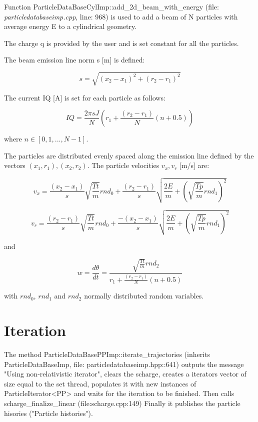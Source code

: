 \documentclass[12pt,a4paper]{article}
\begin{document}
Function ParticleDataBaseCylImp::add\_2d\_beam\_with\_energy (file: \textit{particledatabaseimp.cpp}, line: 968) is used to add a beam of N particles with average energy E to a cylindrical geometry.

The charge q is provided by the user and is set constant for all the particles.

The beam emission line norm s [m] is defined:

\begin{equation}
	s = \sqrt{(x_{2}-x_{1})^2+(r_{2}-r_{1})^2}
\end{equation}

The current IQ [A] is set for each particle as follows:

\begin{equation}
	IQ =\frac{2\pi sJ}{N}(r_{1} + \frac{(r_{2}-r_{1})}{N}(n+0.5))
\end{equation}

where $n\in[0,1,...,N-1]$. 

The particles are distributed evenly spaced along the emission line defined by the vectors $(x_{1},r_{1}), (x_{2},r_{2})$. The particle velocities $v_{x},v_{r}$ [m/s] are:

\begin{equation}
	v_{x}=\frac{(x_{2}-x_{1})}{s}\sqrt{\frac{Tt}{m}}rnd_{0}+\frac{(r_{2}-r_{1})}{s}\sqrt{\frac{2E}{m}+(\sqrt{\frac{Tp}{m}}rnd_{1})^2}
\end{equation}

\begin{equation}
	v_{r}=\frac{(r_{2}-r_{1})}{s}\sqrt{\frac{Tt}{m}}rnd_{0}+\frac{-(x_{2}-x_{1})}{s}\sqrt{\frac{2E}{m}+(\sqrt{\frac{Tp}{m}}rnd_{1})^2} 
\end{equation}

and

\begin{equation}
	w=\frac{d\theta}{dt}=\frac{\sqrt{\frac{Tt}{m}}rnd_{2}}{r_{1} + \frac{(r_{2}-r_{1})}{N}(n+0.5)}
\end{equation}

with $rnd_{0}$, $rnd_{1}$ and $rnd_{2}$ normally distributed random variables.


\section{Iteration}

The method ParticleDataBasePPImp::iterate\_trajectories (inherits ParticleDataBaseImp, file: particledatabaseimp.hpp::641) outputs the message "Using non-relativistic iterator", clears the scharge, creates a iterators vector of size equal to the set thread, populates it with new instances of ParticleIterator<PP> and waits for the iteration to be finished. Then calls scharge\_finalize\_linear (file:scharge.cpp:149) Finally it publishes the particle hisories ("Particle histories").
\end{document}
